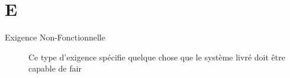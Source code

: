 \section{E}

\begin{description}

\item[Exigence Non-Fonctionnelle] Ce type d'exigence spécifie quelque chose que le système livré doit être capable de fair

\end{description}
